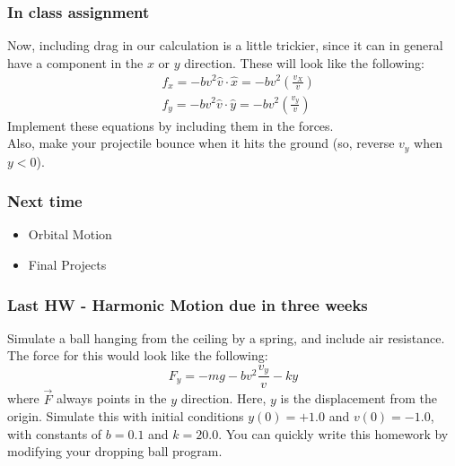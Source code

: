 \documentclass{beamer}
\begin{document}
\begin{frame}
  \frametitle{In class assignment}
  Now, including drag in our calculation is a little trickier, since it
  can in general have a component in the $x$ or $y$ direction. These will
  look like the following:
  \begin{eqnarray*}
    &f_x = -bv^2\hat{v}\cdot\hat{x} = -bv^2\left(\frac{v_X}{v}\right)\\
    &f_y = -bv^2\hat{v}\cdot\hat{y} = -bv^2\left(\frac{v_y}{v}\right)
  \end{eqnarray*}
  Implement these equations by including them in the forces.\\
  Also, make your projectile bounce when it hits the ground (so, reverse $v_y$
  when $y<0$).
\end{frame}

\begin{frame}
  \frametitle{Next time}
  \begin{itemize}
  \item Orbital Motion
  \item Final Projects
  \end{itemize}
\end{frame}

\begin{frame}
  \frametitle{Last HW - Harmonic Motion due in three weeks}
  Simulate a ball hanging from the ceiling by a spring, 
  and include air resistance.
  The force for this would look like the following:
  \begin{equation*}
    F_y = -mg - bv^2\frac{v_y}{v} - ky
  \end{equation*}
  where $\vec{F}$ always points in the $y$ direction. Here,
  $y$ is the displacement from the origin.
  Simulate this with initial conditions $y(0)=+1.0$ and $v(0)=-1.0$, 
  with constants of $b=0.1$ and $k = 20.0$.
  You can quickly write this homework by modifying your dropping ball program.
\end{frame}
\end{document}
